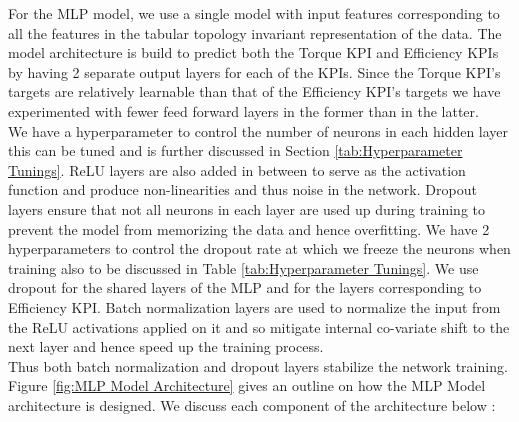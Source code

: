 \documentclass{report} %
\begin{document}

For the \ac{MLP} model, we use a single model with input features corresponding to all the features in the tabular topology invariant representation of the data.
The model architecture is build to predict both the Torque \ac{KPI} and Efficiency \ac{KPI}s by having 2 separate output layers for each of the \ac{KPI}s. 
Since the Torque \ac{KPI}'s targets are relatively learnable than that of the Efficiency \ac{KPI}'s targets we have experimented with fewer feed forward layers in the former than in the latter. \\
We have a hyperparameter to control the number of neurons in each hidden layer this can be tuned and is further discussed in Section \ref{tab:Hyperparameter Tunings}.
\ac{ReLU} layers are also added in between to serve as the activation function and produce non-linearities and thus noise in the network. 
Dropout layers ensure that not all neurons in each layer are used up during training to prevent the model from memorizing the data and hence overfitting.  
We have 2 hyperparameters to control the dropout rate at which we freeze the neurons when training also to be discussed in Table \ref{tab:Hyperparameter Tunings}.
We use dropout for the shared layers of the \ac{MLP} and for the layers corresponding to Efficiency \ac{KPI}.
Batch normalization layers are used to normalize the input from the \ac{ReLU} activations applied on it and so mitigate internal co-variate shift to the next layer and hence speed up the training process.\\
Thus both batch normalization and dropout layers stabilize the network training.
Figure \ref{fig:MLP Model Architecture} gives an outline on how the \ac{MLP} Model architecture is designed. 
We discuss each component of the architecture below :
\end{document}
